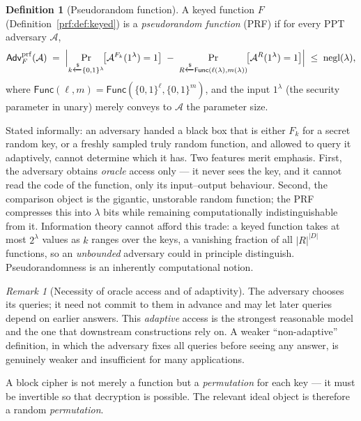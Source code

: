 \documentclass[11pt,a4paper]{article}
\theoremstyle{definition}
\newtheorem{definition}[theorem]{Definition}
\theoremstyle{remark}
\newtheorem{remark}[theorem]{Remark}
\DeclareMathOperator{\negl}{negl}
\begin{document}
\begin{definition}[Pseudorandom function]\label{prf:def:prf}
A keyed function \(F\) (Definition~\ref{prf:def:keyed}) is a \emph{pseudorandom function} (PRF) if for every PPT adversary \(\mathcal{A}\),
\[
  \mathsf{Adv}^{\mathrm{prf}}_{F}(\mathcal{A})
  \;=\;
  \Bigl| \Pr_{k \xleftarrow{\$} \{0,1\}^{\lambda}}\!\bigl[\mathcal{A}^{F_k}(1^\lambda)=1\bigr]
        \;-\;
        \Pr_{R \xleftarrow{\$} \mathsf{Func}(\ell(\lambda), m(\lambda))}\!\bigl[\mathcal{A}^{R}(1^\lambda)=1\bigr] \Bigr|
  \;\le\; \negl(\lambda),
\]
where \(\mathsf{Func}(\ell, m) = \mathsf{Func}(\{0,1\}^{\ell}, \{0,1\}^{m})\), and the input \(1^\lambda\) (the security parameter in unary) merely conveys to \(\mathcal{A}\) the parameter size.
\end{definition}

Stated informally: an adversary handed a black box that is either \(F_k\) for a secret random key, or a freshly sampled truly random function, and allowed to query it adaptively, cannot determine which it has. Two features merit emphasis. First, the adversary obtains \emph{oracle} access only --- it never sees the key, and it cannot read the code of the function, only its input--output behaviour. Second, the comparison object is the gigantic, unstorable random function; the PRF compresses this into \(\lambda\) bits while remaining computationally indistinguishable from it. Information theory cannot afford this trade: a keyed function takes at most \(2^{\lambda}\) values as \(k\) ranges over the keys, a vanishing fraction of all \(|R|^{|D|}\) functions, so an \emph{unbounded} adversary could in principle distinguish. Pseudorandomness is an inherently computational notion.

\begin{remark}[Necessity of oracle access and of adaptivity]\label{prf:rem:adaptive}
The adversary chooses its queries; it need not commit to them in advance and may let later queries depend on earlier answers. This \emph{adaptive} access is the strongest reasonable model and the one that downstream constructions rely on. A weaker ``non-adaptive'' definition, in which the adversary fixes all queries before seeing any answer, is genuinely weaker and insufficient for many applications.
\end{remark}

A block cipher is not merely a function but a \emph{permutation} for each key --- it must be invertible so that decryption is possible. The relevant ideal object is therefore a random \emph{permutation}.
\end{document}
